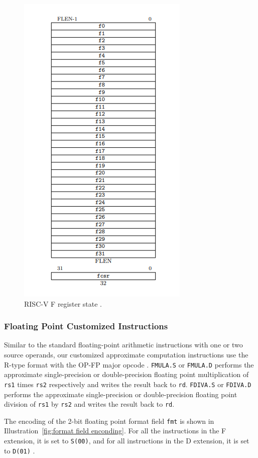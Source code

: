 \begin{figure}[!htp]
    \centering
    \includegraphics[width=0.5\linewidth]{figure/fp-regs.png}
    \caption{RISC-V F register state .}
    \label{fig:risc-v F register state}
\end{figure}

\subsubsection{Floating Point Customized Instructions}

Similar to the standard floating-point arithmetic instructions with one or two source operands, our customized approximate computation instructions use the R-type format with the OP-FP major opcode . \texttt{FMULA.S} or \texttt{FMULA.D} performs the approximate single-precision or double-precision floating point multiplication of \texttt{rs1} times \texttt{rs2} respectively and writes the result back to \texttt{rd}. \texttt{FDIVA.S} or \texttt{FDIVA.D} performs the approximate single-precision or double-precision floating point division of \texttt{rs1} by \texttt{rs2} and writes the result back to \texttt{rd}.

The encoding of the 2-bit floating point format field \texttt{fmt} is shown in Illustration~\ref{fig:format field enconding}. For all the instructions in the F extension, it is set to \texttt{S(00)}, and for all instructions in the D extension, it is set to \texttt{D(01)} .

